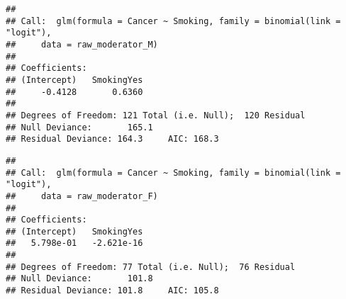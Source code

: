 \documentclass[
]{book}
\newenvironment{Shaded}{\begin{snugshade}}{\end{snugshade}}
\newcommand{\AttributeTok}[1]{\textcolor[rgb]{0.77,0.63,0.00}{#1}}
\newcommand{\CommentTok}[1]{\textcolor[rgb]{0.56,0.35,0.01}{\textit{#1}}}
\newcommand{\DocumentationTok}[1]{\textcolor[rgb]{0.56,0.35,0.01}{\textbf{\textit{#1}}}}
\newcommand{\FunctionTok}[1]{\textcolor[rgb]{0.00,0.00,0.00}{#1}}
\newcommand{\NormalTok}[1]{#1}
\newcommand{\OtherTok}[1]{\textcolor[rgb]{0.56,0.35,0.01}{#1}}
\newcommand{\SpecialCharTok}[1]{\textcolor[rgb]{0.00,0.00,0.00}{#1}}
\newcommand{\StringTok}[1]{\textcolor[rgb]{0.31,0.60,0.02}{#1}}
\begin{document}
\begin{Shaded}
\end{Shaded}

\begin{verbatim}
## 
## Call:  glm(formula = Cancer ~ Smoking, family = binomial(link = "logit"), 
##     data = raw_moderator_M)
## 
## Coefficients:
## (Intercept)   SmokingYes  
##     -0.4128       0.6360  
## 
## Degrees of Freedom: 121 Total (i.e. Null);  120 Residual
## Null Deviance:       165.1 
## Residual Deviance: 164.3     AIC: 168.3
\end{verbatim}

\begin{Shaded}
\end{Shaded}

\begin{verbatim}
## 
## Call:  glm(formula = Cancer ~ Smoking, family = binomial(link = "logit"), 
##     data = raw_moderator_F)
## 
## Coefficients:
## (Intercept)   SmokingYes  
##   5.798e-01   -2.621e-16  
## 
## Degrees of Freedom: 77 Total (i.e. Null);  76 Residual
## Null Deviance:       101.8 
## Residual Deviance: 101.8     AIC: 105.8
\end{verbatim}
\end{document}

